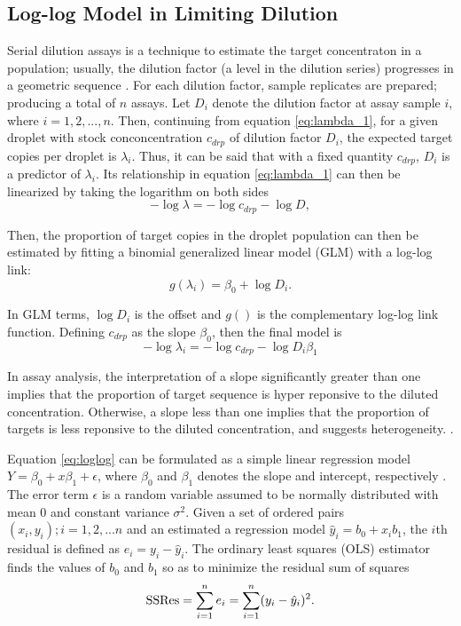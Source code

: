 \subsection{Log-log Model in Limiting Dilution}
\label{sec:targetconc_ch3_loglog}
Serial dilution assays is a technique to estimate the target concentraton in a population; usually, the dilution factor (a level in the dilution series) progresses in a geometric sequence \cite{Deng2017}. For each dilution factor, sample replicates are prepared; producing a total of \(n\) assays. Let \(D_i\) denote the dilution factor at assay sample \(i\), where \(i={1,2,...,n}\). Then, continuing from equation \ref{eq:lambda_1}, for a given droplet with stock conconcentration \(c_{drp}\) of dilution factor \(D_i\), the expected target copies per droplet is \(\lambda_i\). Thus, it can be said that with a fixed quantity \(c_{drp}\), \(D_i\) is a predictor of \(\lambda_i\). Its relationship in equation \ref{eq:lambda_1} can then be linearized by taking the logarithm on both sides
\begin{equation}
    -\log{\lambda} = -\log{c_{drp}} - \log{D}, \label{eq:loglambda}
\end{equation}

Then, the proportion of target copies in the droplet population can then be estimated by fitting a binomial generalized linear model (GLM) with a log-log link:
\[
    g(\lambda_i) = \beta_0 + \log{D_i}.
\]

In GLM terms, \(\log{D_i}\) is the offset and \(g()\) is the complementary log-log link function. Defining \(c_{drp}\) as the slope \(\beta_0 \), then the final model is 
\begin{equation}
    -\log{\lambda_i} = -\log{c_{drp}} - \log{D_i}\beta_1 \label{eq:loglog}
\end{equation}

In assay analysis, the interpretation of a slope significantly greater than one implies that the proportion of target sequence is hyper reponsive to the diluted concentration. Otherwise, a slope less than one implies that the proportion of targets is less reponsive to the diluted concentration, and suggests heterogeneity.  \cite{Hu2009}.

Equation \ref{eq:loglog} can be formulated as a simple linear regression model \(Y = \beta_0 + x\beta_1 + \epsilon\), where \(\beta_0\) and \(\beta_1\) denotes the slope and intercept, respectively \cite{Walpole2011}. The error term \(\epsilon\) is a random variable assumed to be normally distributed with mean 0 and constant variance \(\sigma^2\). Given a set of ordered pairs \({(x_i,y_i); i=1,2,...n}\) and an estimated a regression model \(\hat{y}_i = b_0 + x_ib_1\), the \(i\)th residual is defined as \(e_i = y_i - \hat{y}_i\). The ordinary least squares (OLS) estimator finds the values of \(b_0\) and \(b_1\) so as to minimize the residual sum of squares
\[
    \textup{SSRes} = \sum_{i=1}^{n}e_i = \sum_{i=1}^{n}(y_i - \hat{y}_i)^2.
\]

